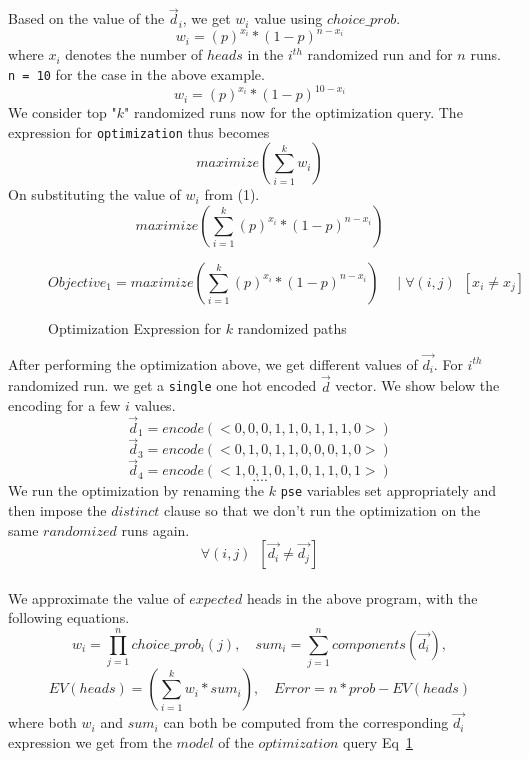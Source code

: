 \documentclass[usenames,dvipsnames,acmsmall]{acmart}
\begin{document}
Based on the value of the $\vec{d}_{i}$, we get $w_{i}$ value using $choice\_prob$. 
\begin{equation}
	w_{i} = {(p)^{x_i} * (1-p)^{n-x_i}}
\end{equation}
where $x_i$ denotes the number of $heads$ in the $i^{th}$ randomized run and for $n$ runs. \texttt{n = 10} for the case in the above example. \\
\begin{equation}
	w_{i} = {(p)^{x_i} * (1-p)^{10-x_i}}
\end{equation}
We consider top "$k$" randomized runs now for the optimization query. The expression for \texttt{optimization} thus becomes 
\[	
	maximize(\sum_{i=1}^{k}{w_i})
\]
On substituting the value of $w_i$ from (1).
\begin{equation}	
	maximize(\sum_{i=1}^{k}{(p)^{x_i} * (1-p)^{n-x_i}})
\end{equation}

\begin{figure}
	\begin{equation}	
		Objective_1 = maximize(\sum_{i=1}^{k}{(p)^{x_i} * (1-p)^{n-x_i}}) \quad \mid \forall (i, j) \enspace [{x_i} \neq {x_j}]
	\end{equation}
	\caption{Optimization Expression for $k$ randomized paths}
	\label{eq:optimization-1}
\end{figure}

After performing the optimization above, we get different values of $\vec{d_i}$. For $i^{th}$ randomized run. we get a \texttt{single} one hot encoded \texttt{$\vec{d}$} vector. We show below the encoding for a few $i$ values. 
\[
\vec{d}_{1} = encode(<0,0,0,1,1,0,1,1,1,0>)
\]
\[
\vec{d}_{3} = encode(<0,1,0,1,1,0,0,0,1,0>)
\]
\[
\vec{d}_{4} = encode(<1,0,1,0,1,0,1,1,0,1>)
\]
\[
	....
\]
We run the optimization by renaming the $k$ \texttt{pse} variables set appropriately and then impose the $distinct$ clause so that we don't run the optimization on the same $randomized$ runs again. \\
\begin{equation}	
	\forall (i, j) \enspace [\vec{d_i} \neq \vec{d_j}]
\end{equation} \\
We approximate the value of $expected$ heads in the above program, with the following equations.
\begin{equation}	
	w_i = \prod_{j=1}^n choice\_prob_{i}(j) ,
	\quad
	sum_i = \sum_{j=1}^n components(\vec{d_i}) ,
\end{equation}
\begin{equation}
	EV(heads) = (\sum_{i=1}^{k}{w_i * sum_i}),
	\quad
	Error = n * prob - EV(heads)
\end{equation}
where both $w_i$ and $sum_i$ can both be computed from the corresponding $\vec{d_i}$ expression we get from the $model$  of the $optimization$ query Eq~\ref{eq:optimization-1}
\end{document}
